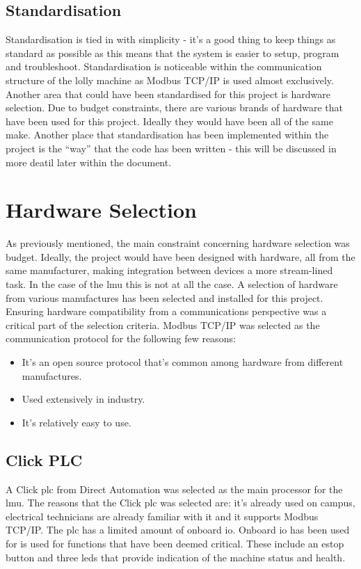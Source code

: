     \subsection{Standardisation}
        Standardisation is tied in with simplicity - it's a good thing to keep things as standard as possible as this means that the system is easier to setup, program and troubleshoot. Standardisation is noticeable within the communication structure of the lolly machine as Modbus TCP/IP is used almost exclusively. Another area that could have been standardised for this project is hardware selection. Due to budget constraints,  there are various brands of hardware that have been used for this project. Ideally they would have been all of the same make. Another place that standardisation has been implemented within the project is the “way” that the code has been written - this will be discussed in more deatil later within the document.
    
    
        
    \section {Hardware Selection}
        As previously mentioned, the main constraint concerning hardware selection was budget. Ideally, the project would have been designed with hardware, all from the same manufacturer, making integration between devices a more stream-lined task. In the case of the \acrshort{lmu} this is not at all the case. A selection of hardware from various manufactures has been selected and installed for this project. Ensuring hardware compatibility from a communications perspective was a critical part of the selection criteria. Modbus TCP/IP was selected as the communication protocol for the following few reasons:
        \begin{itemize}[noitemsep]
            \item It's an open source protocol that's common among hardware from different manufactures.
            \item Used extensively in industry.
            \item It's relatively easy to use.
        \end{itemize}
    
        
    
    \subsection{Click PLC}
        A Click \acrshort{plc} from Direct Automation was selected as the main processor for the \acrshort{lmu}. The reasons that the Click \acrshort{plc} was selected are: it's already used on campus, electrical technicians are already familiar with it and it supports Modbus TCP/IP. The \acrshort{plc} has a limited amount of onboard \acrshort{io}. Onboard \acrshort{io} has been used for is used for functions that have been deemed critical. These include an \acrshort{estop} button and three \acrshort{led}s that provide indication of the machine status and health.
    

